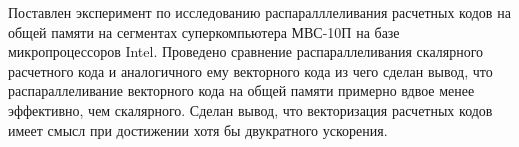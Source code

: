 Поставлен эксперимент по исследованию распаралллеливания расчетных кодов на общей памяти на сегментах суперкомпьютера МВС-10П на базе микропроцессоров Intel.
Проведено сравнение распараллеливания скалярного расчетного кода и аналогичного ему векторного кода из чего сделан вывод, что распараллеливание векторного кода на общей памяти примерно вдвое менее эффективно, чем скалярного.
Сделан вывод, что векторизация расчетных кодов имеет смысл при достижении хотя бы двукратного ускорения.


